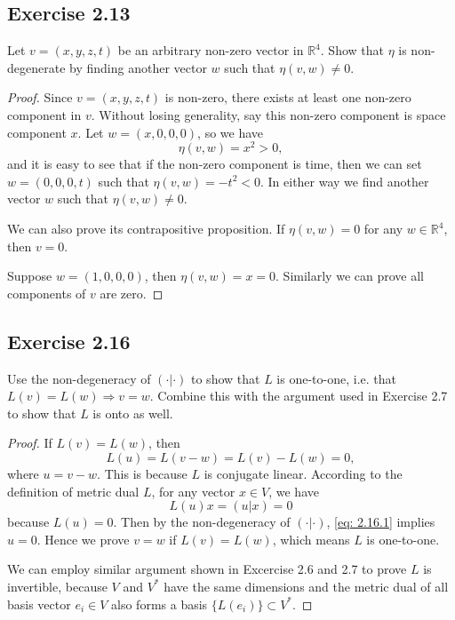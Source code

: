 \documentclass[10pt]{article}
\begin{document}
\subsection{Exercise 2.13}
Let $v = (x,y,z,t)$ be an arbitrary non-zero vector in $\mathbb{R}^4$. Show that $\eta$ is non-degenerate by finding another vector $w$ such that $\eta(v, w) \neq 0$.

\begin{proof}
	Since $v = (x,y,z,t)$ is non-zero, there exists at least one non-zero component in $v$. Without losing generality, say this non-zero component is space component $x$. Let $w = (x, 0, 0, 0)$, so we have
	\begin{equation}
		\eta(v,w) = x^2 > 0,
	\end{equation}
	and it is easy to see that if the non-zero component is time, then we can set $w = (0,0,0,t)$ such that $\eta(v,w) = -t^2 < 0$. In either way we find another vector $w$ such that $\eta(v,w) \neq 0$.

	We can also prove its contrapositive proposition. If $\eta(v,w) = 0$ for any $w \in \mathbb{R}^4$, then $v = 0$.

	Suppose $w = (1, 0, 0, 0)$, then $\eta(v,w) = x =0$. Similarly we can prove all components of $v$ are zero.
\end{proof}

\subsection{Exercise 2.16}
Use the non-degeneracy of $(\cdot|\cdot)$ to show that $L$ is one-to-one, i.e. that $L(v) = L(w) \Longrightarrow v = w$. Combine this with the argument used in Exercise 2.7 to show that $L$ is onto as well.
\begin{proof}
	If $L(v) = L(w)$, then
	\begin{equation}
		L(u) = L(v-w) = L(v) - L(w) = 0,
	\end{equation}
	where $u = v-w$. This is because $L$ is conjugate linear. According to the definition of metric dual $L$, for any vector $x \in V$, we have
	\begin{equation}
		L(u) x = (u|x) = 0 \label{eq: 2.16.1}
	\end{equation}
	because $L(u) = 0$. Then by the non-degeneracy of $(\cdot|\cdot)$, \eqref{eq: 2.16.1} implies $u=0$. Hence we prove $v = w$ if $L(v) = L(w)$, which means $L$ is one-to-one.

	We can employ similar argument shown in Excercise 2.6 and 2.7 to prove $L$ is invertible, because $V$ and $V^*$ have the same dimensions and the metric dual of all basis vector $e_i \in V$ also forms a basis $\{L(e_i)\} \subset V^*$.
\end{proof}
\end{document}
